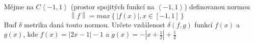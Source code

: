 \subsubsection{}
Mějme na $C\left \langle -1,1 \right \rangle$ (prostor spojitých funkcí na
$\left \langle -1,1 \right \rangle$) definovanou normou $$\left \| f \right
\|=max\left \{ \left | f(x) \right |,x \in \left [ -1,1 \right ] \right \}$$
Buď $\delta$ metrika daná touto normou. Určete vzdálenost $\delta(f,g)$ funkcí
$f(x)$ a $g(x)$, kde $f(x)=\left | 2x-1 \right |-1$ a $g(x)=-\left |
x+\frac{1}{2} \right |+\frac{1}{2}$
